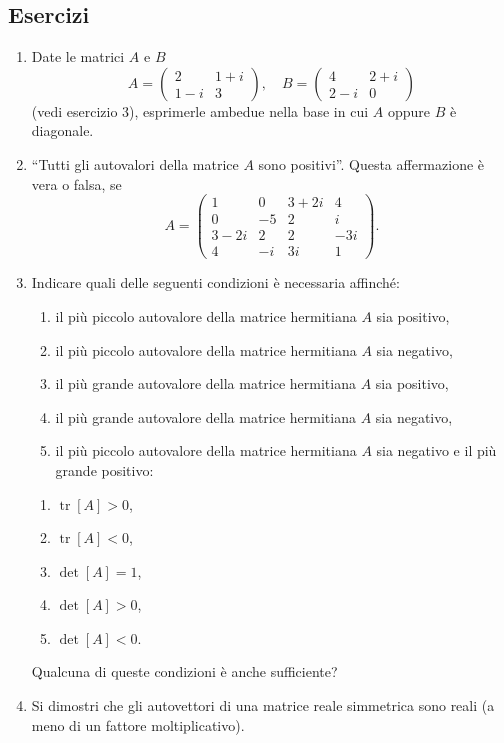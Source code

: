 \documentclass[11pt, a4paper]{book}
\numberwithin{equation}{section}
\newenvironment{esercizi}{\subsection*{Esercizi}\begin{enumerate}}{\end{enumerate}}
\begin{document}
\begin{esercizi}

\item Date le matrici $A$ e $B$
\[
A = \begin{pmatrix} 2 & 1+i \\ 1-i & 3 \end{pmatrix}, \quad
B = \begin{pmatrix} 4 & 2+i \\ 2-i & 0 \end{pmatrix}
\]
(vedi esercizio 3), esprimerle ambedue nella base in cui $A$ oppure $B$ è
diagonale.

\item ``Tutti gli autovalori della matrice $A$ sono positivi''. Questa
affermazione è vera o falsa, se
\[
A =
\begin{pmatrix}
1      & 0      & 3+2i   & 4  \\
0      & -5     & 2      & i  \\
3-2i   & 2      & 2      & -3i \\
4      & -i     & 3i     & 1
\end{pmatrix}.
\]

\item Indicare quali delle seguenti condizioni è necessaria affinché:
\begin{enumerate}
  \item il più piccolo autovalore della matrice hermitiana $A$ sia positivo,
  \item il più piccolo autovalore della matrice hermitiana $A$ sia negativo,
  \item il più grande autovalore della matrice hermitiana $A$ sia positivo,
  \item il più grande autovalore della matrice hermitiana $A$ sia negativo,
  \item il più piccolo autovalore della matrice hermitiana $A$ sia negativo
        e il più grande positivo:
\end{enumerate}
\begin{enumerate}
  \item $\operatorname{tr}[A] > 0$,
  \item $\operatorname{tr}[A] < 0$,
  \item $\det[A] = 1$,
  \item $\det[A] > 0$,
  \item $\det[A] < 0$.
\end{enumerate}
Qualcuna di queste condizioni è anche sufficiente?

\item Si dimostri che gli autovettori di una matrice reale simmetrica sono
reali (a meno di un fattore moltiplicativo).


\end{esercizi}
\end{document}
